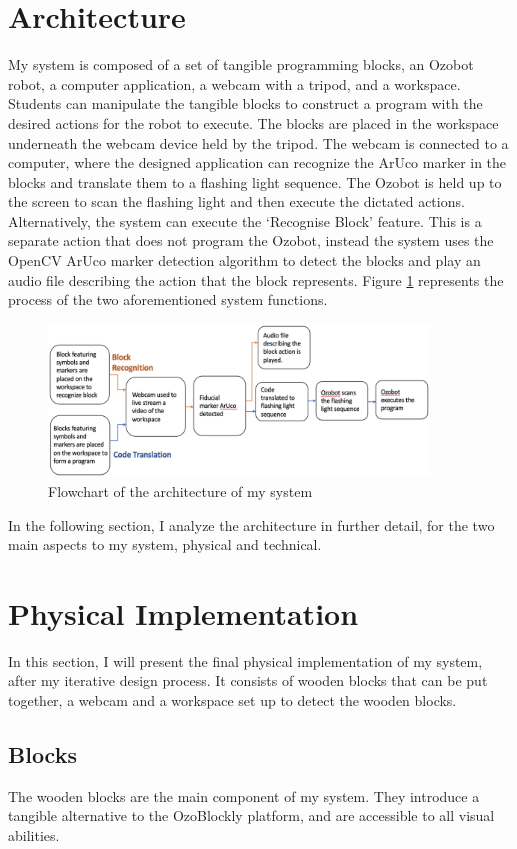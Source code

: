\documentclass[oneside,%
                    author={Malak Hajji},
                    degree={BSc},
                    title={Designing An Accessible Ozobot Programming Platform for Students},
                  subtitle={With Mixed Visual Abilities}]{dissertation}
\begin{document}
\section{Architecture}
My system is composed of a set of tangible programming blocks, an Ozobot robot, a computer application, a webcam with a tripod, and a workspace. Students can manipulate the tangible blocks to construct a program with the desired actions for the robot to execute. The blocks are placed in the workspace underneath the webcam device held by the tripod. The webcam is connected to a computer, where the designed application can recognize the ArUco marker in the blocks and translate them to a flashing light sequence. The Ozobot is held up to the screen to scan the flashing light and then execute the dictated actions. Alternatively, the system can execute the ‘Recognise Block’ feature. This is a separate action that does not program the Ozobot, instead the system uses the OpenCV ArUco marker detection algorithm to detect the blocks and play an audio file describing the action that the block represents. Figure \ref{fig-flowchart} represents the process of the two aforementioned system functions.
\FloatBarrier
\begin{figure}[h]
    \centering
    \includegraphics[width=0.9\textwidth]{flowchart.eps}
    \caption{Flowchart of the architecture of my system}
    \label{fig-flowchart}
\end{figure}
\FloatBarrier
In the following section, I analyze the architecture in further detail, for the two main aspects to my system, physical and technical.
\section{Physical Implementation}
In this section, I will present the final physical implementation of my system, after my iterative design process. It consists of wooden blocks that can be put together, a webcam and a workspace set up to detect the wooden blocks.
\subsection{Blocks}
The wooden blocks are the main component of my system. They introduce a tangible alternative to the OzoBlockly platform, and are accessible to all visual abilities.
\end{document}
